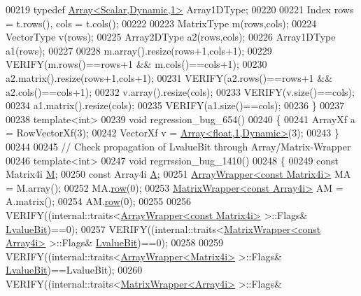 \begin{DoxyCode}
00219   \textcolor{keyword}{typedef} \hyperlink{group___core___module_class_eigen_1_1_array}{Array<Scalar,Dynamic,1>} Array1DType;
00220 
00221   Index rows = t.rows(), cols = t.cols();
00222 
00223   MatrixType m(rows,cols);
00224   VectorType v(rows);
00225   Array2DType a2(rows,cols);
00226   Array1DType a1(rows);
00227 
00228   m.array().resize(rows+1,cols+1);
00229   VERIFY(m.rows()==rows+1 && m.cols()==cols+1);
00230   a2.matrix().resize(rows+1,cols+1);
00231   VERIFY(a2.rows()==rows+1 && a2.cols()==cols+1);
00232   v.array().resize(cols);
00233   VERIFY(v.size()==cols);
00234   a1.matrix().resize(cols);
00235   VERIFY(a1.size()==cols);
00236 \}
00237 
00238 \textcolor{keyword}{template}<\textcolor{keywordtype}{int}>
00239 \textcolor{keywordtype}{void} regression\_bug\_654()
00240 \{
00241   ArrayXf a = RowVectorXf(3);
00242   VectorXf v = \hyperlink{group___core___module_class_eigen_1_1_array}{Array<float,1,Dynamic>}(3);
00243 \}
00244 
00245 \textcolor{comment}{// Check propagation of LvalueBit through Array/Matrix-Wrapper}
00246 \textcolor{keyword}{template}<\textcolor{keywordtype}{int}>
00247 \textcolor{keywordtype}{void} regrrssion\_bug\_1410()
00248 \{
00249   \textcolor{keyword}{const} Matrix4i \hyperlink{group___core___module_class_eigen_1_1_matrix}{M};
00250   \textcolor{keyword}{const} Array4i \hyperlink{group___core___module_class_eigen_1_1_matrix}{A};
00251   \hyperlink{group___core___module_class_eigen_1_1_array_wrapper}{ArrayWrapper<const Matrix4i>} MA = M.array();
00252   MA.\hyperlink{group___core___module_a4ea11afe36c7962c706caa93decd1380}{row}(0);
00253   \hyperlink{group___core___module_class_eigen_1_1_matrix_wrapper}{MatrixWrapper<const Array4i>} AM = A.matrix();
00254   AM.\hyperlink{group___core___module_a4ea11afe36c7962c706caa93decd1380}{row}(0);
00255 
00256   VERIFY((internal::traits<\hyperlink{group___core___module_class_eigen_1_1_array_wrapper}{ArrayWrapper<const Matrix4i>} >::Flags&
      \hyperlink{group__flags_gae2c323957f20dfdc6cb8f44428eaec1a}{LvalueBit})==0);
00257   VERIFY((internal::traits<\hyperlink{group___core___module_class_eigen_1_1_matrix_wrapper}{MatrixWrapper<const Array4i>} >::Flags&
      \hyperlink{group__flags_gae2c323957f20dfdc6cb8f44428eaec1a}{LvalueBit})==0);
00258 
00259   VERIFY((internal::traits<\hyperlink{group___core___module_class_eigen_1_1_array_wrapper}{ArrayWrapper<Matrix4i>} >::Flags&
      \hyperlink{group__flags_gae2c323957f20dfdc6cb8f44428eaec1a}{LvalueBit})==LvalueBit);
00260   VERIFY((internal::traits<\hyperlink{group___core___module_class_eigen_1_1_matrix_wrapper}{MatrixWrapper<Array4i>} >::Flags&

\end{DoxyCode}
